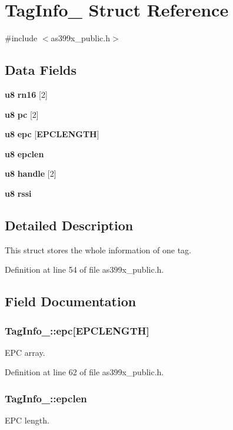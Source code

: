 \section{Tag\-Info\-\_\- Struct Reference}
\label{struct_tag_info__}


{\ttfamily \#include $<$as399x\-\_\-public.\-h$>$}

\subsection*{Data Fields}
\begin{DoxyCompactItemize}
\item 
{\bf u8} {\bf rn16} [2]
\item 
{\bf u8} {\bf pc} [2]
\item 
{\bf u8} {\bf epc} [{\bf E\-P\-C\-L\-E\-N\-G\-T\-H}]
\item 
{\bf u8} {\bf epclen}
\item 
{\bf u8} {\bf handle} [2]
\item 
{\bf u8} {\bf rssi}
\end{DoxyCompactItemize}


\subsection{Detailed Description}
This struct stores the whole information of one tag. 

Definition at line 54 of file as399x\-\_\-public.\-h.



\subsection{Field Documentation}
\subsubsection[{epc}]{ Tag\-Info\-\_\-\-::epc[{\bf E\-P\-C\-L\-E\-N\-G\-T\-H}]}\label{struct_tag_info___a9c211331f6a8184cbdd4d4b0c075bfec}
E\-P\-C array. 

Definition at line 62 of file as399x\-\_\-public.\-h.

\subsubsection[{epclen}]{ Tag\-Info\-\_\-\-::epclen}\label{struct_tag_info___a0560644c81b806ba37fb672720c41fc2}
E\-P\-C length. 


